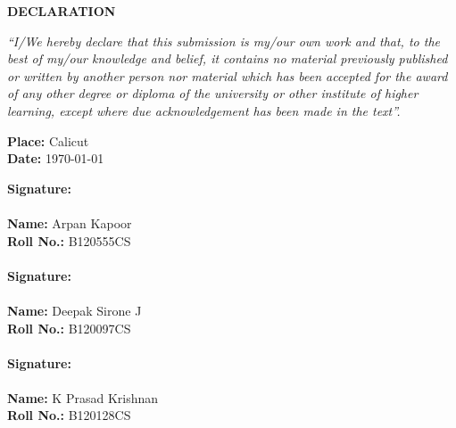 \thispagestyle{empty}
\vspace*{1cm}
{\centering \textbf{DECLARATION}\\[1.5cm]}

\noindent
\textit{``I/We hereby declare that this submission is my/our own work and that,
to the best of my/our knowledge and belief, it contains no material previously
published or written by another person nor material which has been accepted for
the award of any other degree or diploma of the university or other institute
of higher learning, except where due acknowledgement has been made in the
text''.}

\vspace{2cm}

\parbox[t]{8.5cm}{
\textbf{Place:} Calicut \\
\textbf{Date:} \today \\

}
\parbox[t]{8.5cm}{
\textbf{Signature: }\\\\
\textbf{Name:} Arpan Kapoor \\
\textbf{Roll No.:} B120555CS \\\\

\textbf{Signature:} \\\\
\textbf{Name:} Deepak Sirone J \\
\textbf{Roll No.:} B120097CS \\\\

\textbf{Signature:}\\\\
\textbf{Name:} K Prasad Krishnan \\
\textbf{Roll No.:} B120128CS}
